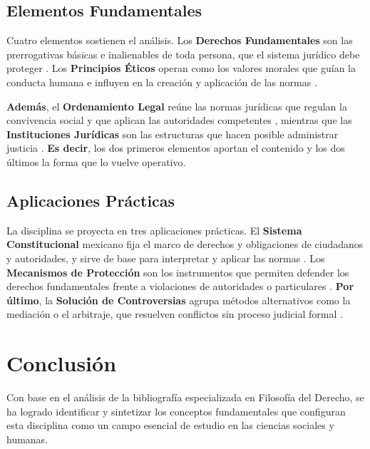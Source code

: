 \documentclass[
	spanish, %
	letterpaper, oneside
]{article}
\begin{document}
\subsection{Elementos Fundamentales}

Cuatro elementos sostienen el análisis. Los \textbf{Derechos Fundamentales} son las prerrogativas básicas e inalienables de toda persona, que el sistema jurídico debe proteger \cite{cpeum2026,LeyAmparoReglamentaria}. Los \textbf{Principios Éticos} operan como los valores morales que guían la conducta humana e influyen en la creación y aplicación de las normas \cite{finnisEstudiosTeoriaDerecho2017,lovonManualPracticoFilosofia2020}.

\textbf{Además}, el \textbf{Ordenamiento Legal} reúne las normas jurídicas que regulan la convivencia social y que aplican las autoridades competentes \cite{rojas-gonzalezFilosofiaDerecho2018}, mientras que las \textbf{Instituciones Jurídicas} son las estructuras que hacen posible administrar justicia \cite{lastraConceptosJuridicosFundamentales}. \textbf{Es decir}, los dos primeros elementos aportan el contenido y los dos últimos la forma que lo vuelve operativo.

\subsection{Aplicaciones Prácticas}

La disciplina se proyecta en tres aplicaciones prácticas. El \textbf{Sistema Constitucional} mexicano fija el marco de derechos y obligaciones de ciudadanos y autoridades, y sirve de base para interpretar y aplicar las normas \cite{cpeum2026}. Los \textbf{Mecanismos de Protección} son los instrumentos que permiten defender los derechos fundamentales frente a violaciones de autoridades o particulares \cite{LeyAmparoReglamentaria,LeyGeneralVictimas,franzoniacevedoLeyGeneralAcceso2017}. \textbf{Por último}, la \textbf{Solución de Controversias} agrupa métodos alternativos como la mediación o el arbitraje, que resuelven conflictos sin proceso judicial formal \cite{lastraConceptosJuridicosFundamentales}.

\section{Conclusión}

Con base en el análisis de la bibliografía especializada en Filosofía del Derecho, se ha logrado identificar y sintetizar los conceptos fundamentales que configuran esta disciplina como un campo esencial de estudio en las ciencias sociales y humanas.
\end{document}
